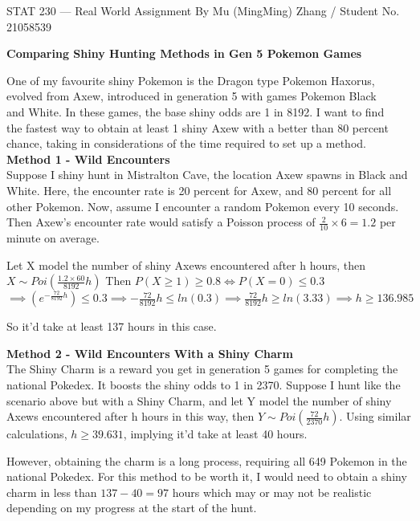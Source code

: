 \documentclass[11pt]{article}
\begin{document}
\parindent=0pt
STAT 230 --- Real World Assignment  By Mu (MingMing) Zhang / Student No. 21058539

\textbf{\Large Comparing Shiny Hunting Methods in Gen 5 Pokemon Games}

One of my favourite shiny Pokemon is the Dragon type Pokemon Haxorus, 
\\evolved from Axew, introduced in generation 5 with games Pokemon Black 
\\and White. In these games, the base shiny odds are 1 in 8192. I want to find 
\\the fastest way to obtain at least 1 shiny Axew with a better than 80 percent 
\\chance, taking in considerations of the time required to set up a method.
\\

\textbf{Method 1 - Wild Encounters}
\\Suppose I shiny hunt in Mistralton Cave, the location Axew spawns in Black and White. Here, the encounter rate is 20 percent for Axew, and 80 percent for all other Pokemon. Now, assume I encounter a random Pokemon every 10 seconds. Then Axew's encounter rate would satisfy a Poisson process of $\frac {2}{10} \times 6 = 1.2$ per minute on average.

Let X model the number of shiny Axews encountered after h hours, then $X \sim Poi (\frac{1.2 \times 60}{8192}h)$
Then $P(X\geq 1)\geq 0.8 \iff P(X = 0)\leq 0.3$
\\$\implies (e^{-\frac{72}{8192}h})\leq 0.3 
\implies -\frac{72}{8192}h \leq ln(0.3) \implies \frac{72}{8192}h \geq ln(3.33) \implies h \geq 136.985$

So it'd take at least 137 hours in this case.

\textbf{Method 2 - Wild Encounters With a Shiny Charm}
\\The Shiny Charm is a reward you get in generation 5 games for completing the national Pokedex. It boosts the shiny odds to 1 in 2370. Suppose I hunt like the scenario above but with a Shiny Charm, and let Y model the number of shiny Axews encountered after h hours in this way, then $Y \sim Poi (\frac{72}{2370}h)$. Using similar calculations, $h \geq 39.631$, implying it'd take at least 40 hours.

However, obtaining the charm is a long process, requiring all 649 Pokemon in the national Pokedex. For this method to be worth it, I would need to obtain a shiny charm in less than $137 - 40 = 97$ hours which may or may not be realistic depending on my progress at the start of the hunt.
\end{document}
